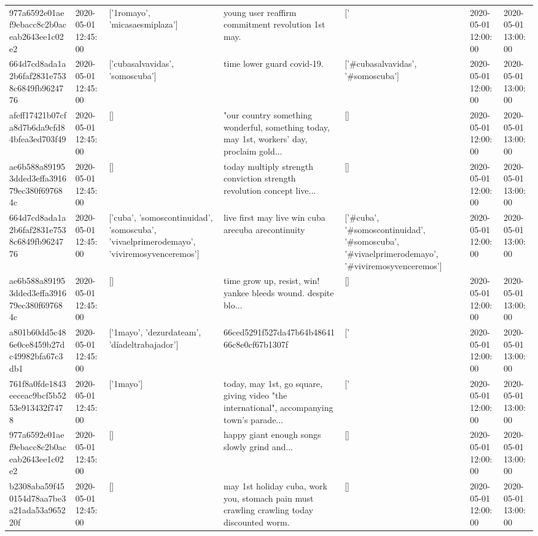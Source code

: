 \begin{tabular}{lllllll}
977a6592e01aef9ebacc8c2b0aceab2643ee1c02e2 & 2020-05-01 12:45:00 & ['1romayo', 'micasaesmiplaza'] & young user reaffirm commitment revolution 1st may. & ['#1romayo', '#micasaesmiplaza'] & 2020-05-01 12:00:00 & 2020-05-01 13:00:00 \\
664d7cd8ada1a2b6faf2831e7538c6849fb9624776 & 2020-05-01 12:45:00 & ['cubasalvavidas', 'somoscuba'] & time lower guard covid-19. & ['#cubasalvavidas', '#somoscuba'] & 2020-05-01 12:00:00 & 2020-05-01 13:00:00 \\
afeff17421b07cfa8d7b6da9cfd84bfea3ed703f49 & 2020-05-01 12:45:00 & [] & "our country something wonderful, something today, may 1st, workers' day, proclaim gold... & [] & 2020-05-01 12:00:00 & 2020-05-01 13:00:00 \\
ae6b588a891953dded3effa391679ec380f697684c & 2020-05-01 12:45:00 & [] & today multiply strength conviction strength revolution concept live... & [] & 2020-05-01 12:00:00 & 2020-05-01 13:00:00 \\
664d7cd8ada1a2b6faf2831e7538c6849fb9624776 & 2020-05-01 12:45:00 & ['cuba', 'somoscontinuidad', 'somoscuba', 'vivaelprimerodemayo', 'viviremosyvenceremos'] & live first may live win cuba arecuba arecontinuity & ['#cuba', '#somoscontinuidad', '#somoscuba', '#vivaelprimerodemayo', '#viviremosyvenceremos'] & 2020-05-01 12:00:00 & 2020-05-01 13:00:00 \\
ae6b588a891953dded3effa391679ec380f697684c & 2020-05-01 12:45:00 & [] & time grow up, resist, win! yankee bleeds wound. despite blo... & [] & 2020-05-01 12:00:00 & 2020-05-01 13:00:00 \\
a801b60dd5c486e0ce8459b27dc49982bfa67c3db1 & 2020-05-01 12:45:00 & ['1mayo', 'dezurdateam', 'díadeltrabajador'] & 66ced5291f527da47b64b4864166c8e0cf67b1307f & ['#1mayo', '#dezurdateam', '#díadeltrabajador'] & 2020-05-01 12:00:00 & 2020-05-01 13:00:00 \\
761f8a0fde1843eeceac9bcf5b5253e913432f7478 & 2020-05-01 12:45:00 & ['1mayo'] & today, may 1st, go square, giving video "the international", accompanying town's parade... & ['#1mayo'] & 2020-05-01 12:00:00 & 2020-05-01 13:00:00 \\
977a6592e01aef9ebacc8c2b0aceab2643ee1c02e2 & 2020-05-01 12:45:00 & [] & happy giant enough songs slowly grind and... & [] & 2020-05-01 12:00:00 & 2020-05-01 13:00:00 \\
b2308aba59f450154d78aa7be3a21ada53a965220f & 2020-05-01 12:45:00 & [] & may 1st holiday cuba, work you, stomach pain must crawling crawling today discounted worm. & [] & 2020-05-01 12:00:00 & 2020-05-01 13:00:00 \\

\end{tabular}
